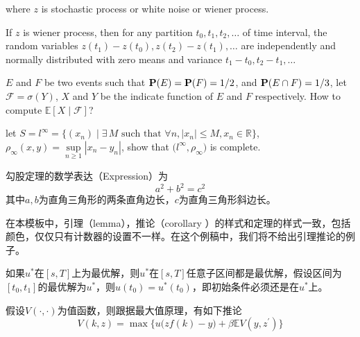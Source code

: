 \documentclass[color=green,mathpazo,titlestyle=hang]{elegantbook}
\begin{document}
where $z$ is stochastic process or white noise or wiener process.

\begin{newdef}
If $z$ is wiener process, then for any partition $t_0,t_1,t_2,\ldots$ of time interval, the random variables $z(t_1)-z(t_0),z(t_2)-z(t_1),\ldots$ are independently and normally distributed with zero means and variance $t_1-t_0,t_2-t_1,\ldots$
\end{newdef}

\lipsum[5]

\begin{example}
$E$ and $F$ be two events such that $\mathbf{P}(E)=\mathbf{P}(F)=1/2$, and $\mathbf{P}(E\cap F)=1/3$, let $\mathscr{F}=\sigma(Y)$,  $X$ and $Y$ be the indicate function of $E$ and $F$ respectively. How to compute $\mathbb{E}[ X\mid \mathscr{F} ]$?
\end{example}
\lipsum[4]
\begin{exercise}
let $S=l^\infty=\big\{(x_n)\mid \exists\, M \text{ such that } \forall n, |x_n|\leq M,x_n\in \mathbb{R}\big\}$, $\rho_{\infty}(x,y)=\sup\limits_{n\geq 1}|x_n-y_n|$, show that $\big(l^\infty,\rho_{\infty}\big)$ is complete.
\end{exercise}

\begin{newthem}[勾股定理]
勾股定理的数学表达（Expression）为
\[a^2+b^2=c^2\]
其中$a,b$为直角三角形的两条直角边长，$c$为直角三角形斜边长。
\end{newthem}

\begin{note}
在本模板中，引理（lemma），推论（corollary ）的样式和定理的样式一致，包括颜色，仅仅只有计数器的设置不一样。在这个例稿中，我们将不给出引理推论的例子。
\end{note}


\lipsum[4]

\begin{newprop}[最优性原理]
如果$u^*$在$[s,T]$上为最优解，则$u^*$在$[s,T]$任意子区间都是最优解，假设区间为$[t_0,t_1]$的最优解为$u^*$，则$u(t_0)=u^{*}(t_0)$，即初始条件必须还是在$u^*$上。
\end{newprop}

\lipsum[5-6]
\begin{newcorol}
假设$V(\cdot,\cdot)$为值函数，则跟据最大值原理，有如下推论
\[
V(k,z)=\max\Big\{u\big(zf(k)-y\big)+\beta \mathbb{E}V(y,z^\prime)\Big\}
\]
\end{newcorol}
\end{document}
